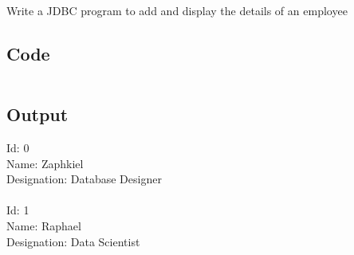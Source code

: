 \documentclass[../main.tex]{subfiles}
\begin{document}
Write a JDBC program to add and display the details of an employee

\subsection{Code}
\inputminted[frame=lines, breaklines, breakanywhere, numberblanklines=false]{java}{./programs/prog22/Employee.java}

\subsection{Output}
Id: 0 \\
Name: Zaphkiel \\
Designation: Database Designer \\
\\
Id: 1 \\
Name: Raphael \\
Designation: Data Scientist \\
\end{document}
